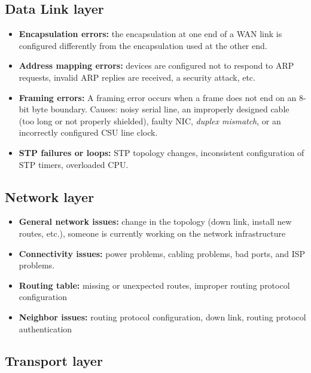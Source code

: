 \subsection{Data Link layer}

\begin{itemize}
\item \textbf{Encapsulation errors:} the encapsulation at one end of a WAN link is configured differently from the encapsulation used at the other end.

\item \textbf{Address mapping errors:} devices are configured not to respond to ARP requests, invalid ARP replies are received, a security attack, etc.

\item \textbf{Framing errors:} A framing error occurs when a frame does not end on an 8-bit byte boundary. Causes: noisy serial line, an improperly designed cable (too long or not properly shielded), faulty NIC, \emph{duplex mismatch}, or an incorrectly configured CSU line clock.

\item \textbf{STP failures or loops:} STP topology changes, inconsistent configuration of STP timers, overloaded CPU. 
\end{itemize}

\subsection{Network layer}

\begin{itemize}
\item \textbf{General network issues:} change in the topology (down link, install new routes, etc.), someone is currently working on the network infrastructure

\item \textbf{Connectivity issues:} power problems, cabling problems, bad ports, and ISP problems. 

\item \textbf{Routing table:} missing or unexpected routes, improper routing protocol configuration

\item \textbf{Neighbor issues:} routing protocol configuration, down link, routing protocol authentication
\end{itemize}

\subsection{Transport layer}

